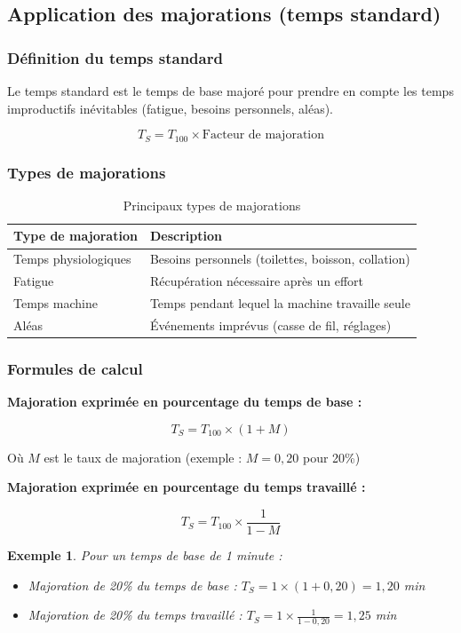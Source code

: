 \documentclass[a4paper,12pt]{article}
\newtheorem{exemple}{Exemple}[section]
\begin{document}
\subsection{Application des majorations (temps standard)}

\subsubsection{Définition du temps standard}

Le temps standard est le temps de base majoré pour prendre en compte les temps improductifs inévitables (fatigue, besoins personnels, aléas).

\[
T_S = T_{100} \times \text{Facteur de majoration}
\]

\subsubsection{Types de majorations}

\begin{table}[ht]
\centering
\begin{tabular}{|p{4cm}|p{10cm}|}
\hline
\textbf{Type de majoration} & \textbf{Description} \\
\hline
Temps physiologiques & Besoins personnels (toilettes, boisson, collation) \\
Fatigue & Récupération nécessaire après un effort \\
Temps machine & Temps pendant lequel la machine travaille seule \\
Aléas & Événements imprévus (casse de fil, réglages) \\
\hline
\end{tabular}
\caption{Principaux types de majorations}
\end{table}

\subsubsection{Formules de calcul}

\textbf{Majoration exprimée en pourcentage du temps de base :}

\[
T_S = T_{100} \times (1 + M)
\]

Où $M$ est le taux de majoration (exemple : $M = 0,20$ pour 20\%)

\textbf{Majoration exprimée en pourcentage du temps travaillé :}

\[
T_S = T_{100} \times \frac{1}{1 - M}
\]

\begin{exemple}
Pour un temps de base de 1 minute :

\begin{itemize}
    \item Majoration de 20\% du temps de base : $T_S = 1 \times (1 + 0,20) = 1,20$ min
    \item Majoration de 20\% du temps travaillé : $T_S = 1 \times \frac{1}{1 - 0,20} = 1,25$ min
\end{itemize}
\end{exemple}
\end{document}
